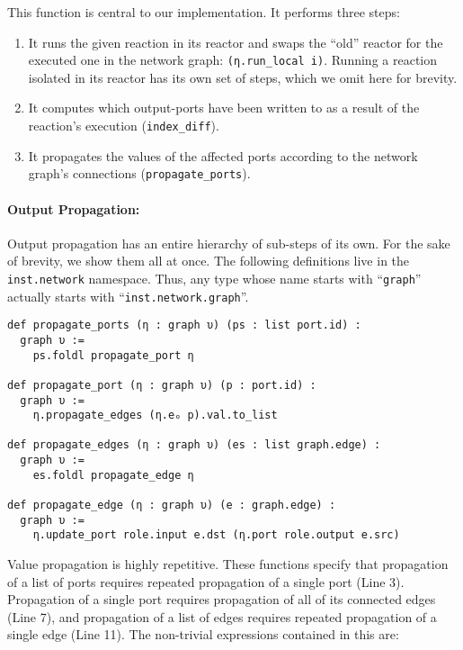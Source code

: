 \noindent This function is central to our implementation. It performs three steps:

\begin{enumerate}
  \item It runs the given reaction in its reactor and swaps the ``old'' reactor for the executed one in the network graph: \lstinline{(η.run_local i)}.
  Running a reaction isolated in its reactor has its own set of steps, which we omit here for brevity.
  \item It computes which output-ports have been written to as a result of the reaction's execution (\lstinline{index_diff}).
  \item It propagates the values of the affected ports according to the network graph's connections (\lstinline{propagate_ports}).
\end{enumerate}

\paragraph{Output Propagation:}

Output propagation has an entire hierarchy of sub-steps of its own.
For the sake of brevity, we show them all at once.
The following definitions live in the \lstinline{inst.network} namespace.
Thus, any type whose name starts with ``\lstinline{graph}'' actually starts with ``\lstinline{inst.network.graph}''.

\lstset{numbers=left, xleftmargin=2em}
\begin{lstlisting}
def propagate_ports (η : graph υ) (ps : list port.id) : 
  graph υ :=
    ps.foldl propagate_port η

def propagate_port (η : graph υ) (p : port.id) : 
  graph υ := 
    η.propagate_edges (η.eₒ p).val.to_list 

def propagate_edges (η : graph υ) (es : list graph.edge) : 
  graph υ := 
    es.foldl propagate_edge η

def propagate_edge (η : graph υ) (e : graph.edge) : 
  graph υ := 
    η.update_port role.input e.dst (η.port role.output e.src)
\end{lstlisting}
\lstset{numbers=none, xleftmargin=0em}

\noindent Value propagation is highly repetitive. 
These functions specify that propagation of a list of ports requires repeated propagation of a single port (Line 3).
Propagation of a single port requires propagation of all of its connected edges (Line 7), and propagation of a list of edges requires repeated propagation of a single edge (Line 11).
The non-trivial expressions contained in this are:

